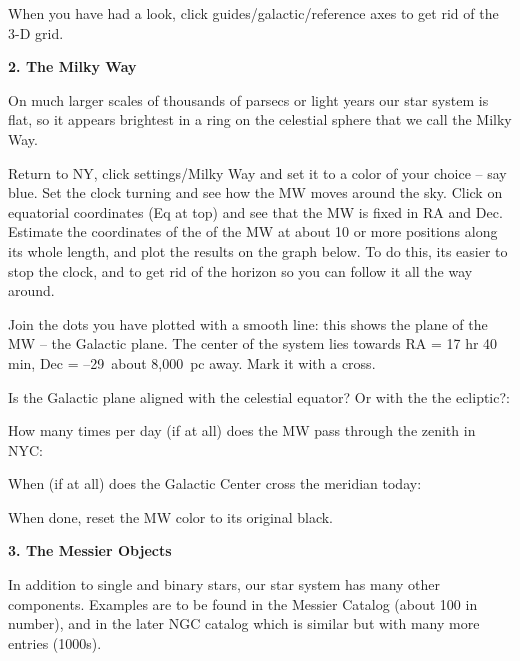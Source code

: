 \documentclass[12pt]{article}
\begin{document}
When you have had a look, click guides/galactic/reference axes to get 
rid of the 3-D grid.


\bigskip
\noindent
{\bf 2. The Milky Way} 

\medskip\noindent
On much larger scales of thousands of parsecs or light years our star
system is flat, so it appears brightest in a ring on the celestial
sphere that we call the Milky Way.

Return to NY, click settings/Milky Way and set it to a color of your
choice -- say blue. Set the clock turning and see how the MW moves
around the sky.  Click on equatorial coordinates (Eq at top) and see
that the MW is fixed in RA and Dec. Estimate the coordinates of the of
the MW at about 10 or more positions along its whole length, and plot the
results on the graph below. To do this, its easier to stop the clock,
and to get rid of the horizon so you can follow it all the way around.

\vspace{0.1cm}

\begin{figure*}[h]
        \centerline{}
         \end{figure*}

\newpage
\noindent
Join the dots you have plotted with a smooth line: this
shows the plane of the MW -- the Galactic plane. The
center of the system lies towards  RA = 17 hr 40
min, Dec = --29\deg\ about 8,000~pc away. Mark it with a cross.

\bigskip
\noindent
Is the Galactic plane aligned with the celestial equator? Or with the
the ecliptic?: \\ \makebox[4cm]{\hrulefill}

\bigskip
\noindent
How many times per day (if at all) does the MW pass through the zenith in NYC:
\makebox[4cm]{\hrulefill}

\bigskip
\noindent
When (if at all) does the Galactic Center cross the meridian today:
\makebox[4cm]{\hrulefill}

\bigskip
\noindent
When done, reset the MW color to its original black.

\bigskip
\bigskip
\bigskip
\bigskip
\noindent
{\bf 3. The Messier Objects} 

\medskip
\noindent
In addition to single and binary stars, our star system has many other
components. Examples are to be found in the Messier Catalog (about 100
in number), and in the later NGC catalog which is similar but with
many more entries (1000s).
\end{document}
